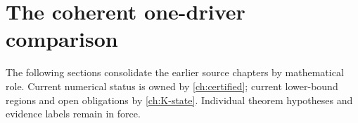\chapter{The coherent one-driver comparison}\label{ch:09-one-driver}
\noindent The following sections consolidate the earlier source chapters by mathematical role. Current numerical status is owned by \autoref{ch:certified}; current lower-bound regions and open obligations by \autoref{ch:K-state}. Individual theorem hypotheses and evidence labels remain in force.












